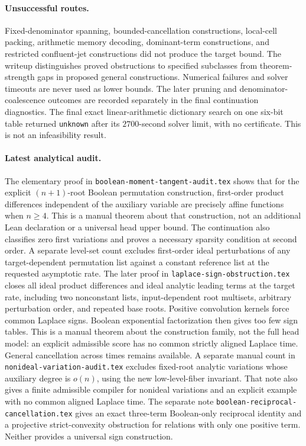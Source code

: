 \documentclass[11pt]{article}
\begin{document}
\paragraph{Unsuccessful routes.}
Fixed-denominator spanning, bounded-cancellation constructions,
local-cell packing, arithmetic memory decoding, dominant-term
constructions, and restricted confluent-jet constructions did not
produce the target bound. The writeup distinguishes proved obstructions
to specified subclasses from theorem-strength gaps in proposed general
constructions. Numerical failures and solver timeouts are never used
as lower bounds. The later pruning and denominator-coalescence outcomes
are recorded separately in the final continuation diagnostics. The final
exact linear-arithmetic dictionary search on one six-bit table returned
\texttt{unknown} after its $2700$-second solver limit, with no certificate.
This is not an infeasibility result.

\paragraph{Latest analytical audit.}
The elementary proof in \texttt{boolean-moment-tangent-audit.tex}
shows that for the explicit $(n+1)$-root Boolean permutation construction,
first-order product differences independent of the auxiliary variable
are precisely affine functions when $n\ge4$. This is a manual theorem
about that construction, not an additional Lean declaration or a
universal head upper bound. The continuation also classifies zero first
variations and proves a necessary sparsity condition at second order.
A separate level-set count excludes first-order ideal perturbations of
any target-dependent permutation list against a constant reference list
at the requested asymptotic rate. The later proof in
\texttt{laplace-sign-obstruction.tex} closes all ideal product
differences and ideal analytic leading terms at the target rate,
including two nonconstant lists, input-dependent root multisets,
arbitrary perturbation order, and repeated base roots. Positive
convolution kernels force common Laplace signs. Boolean exponential
factorization then gives too few sign tables. This is a manual
theorem about the construction family, not the full head model:
an explicit admissible score has no common strictly aligned Laplace
time. General cancellation across times remains available. A separate
manual count in \texttt{nonideal-variation-audit.tex} excludes fixed-root
analytic variations whose auxiliary degree is $o(n)$, using the new
low-level-fiber invariant. That note also gives a finite admissible
compiler for nonideal variations and an explicit example with no
common aligned Laplace time.
The separate note \texttt{boolean-reciprocal-cancellation.tex} gives
an exact three-term Boolean-only reciprocal identity and a projective
strict-convexity obstruction for relations with only one positive term.
Neither provides a universal sign construction.
\end{document}
